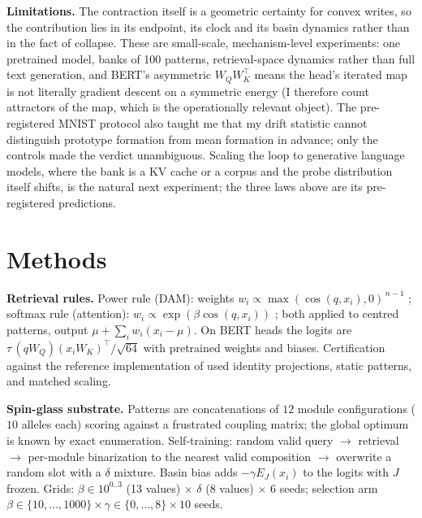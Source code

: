 \documentclass[preprint,12pt,authoryear]{elsarticle}
\begin{document}
\textbf{Limitations.} The contraction itself is a geometric certainty for
convex writes, so the contribution lies in its endpoint, its clock and its
basin dynamics rather than in the fact of collapse. These are small-scale,
mechanism-level experiments:
one pretrained model, banks of 100 patterns, retrieval-space dynamics
rather than full text generation, and BERT's asymmetric $W_Q W_K^{\top}$
means the head's iterated map is not literally gradient descent on a
symmetric energy (I therefore count attractors of the map, which is the
operationally relevant object). The pre-registered MNIST protocol also
taught me that my drift statistic cannot distinguish prototype formation
from mean formation in advance; only the controls made the verdict
unambiguous. Scaling the loop to generative language models, where the
bank is a KV cache or a corpus and the probe distribution itself shifts,
is the natural next experiment; the three laws above are its
pre-registered predictions.

\section{Methods}

\textbf{Retrieval rules.} Power rule (DAM): weights
$w_i\propto\max(\cos(q,x_i),0)^{\,n-1}$ \citep{krotov2016}; softmax rule
(attention): $w_i\propto\exp(\beta\cos(q,x_i))$ \citep{ramsauer2021}; both
applied to centred patterns, output $\mu + \sum_i w_i (x_i-\mu)$. On BERT
heads the logits are $\tau\,(qW_Q)(x_iW_K)^{\top}/\sqrt{64}$ with
pretrained weights and biases. Certification against the reference
implementation of \citet{ramsauer2021} used identity projections, static
patterns, and matched scaling.

\textbf{Spin-glass substrate.} Patterns are concatenations of $12$ module
configurations ($10$ alleles each) scoring against a frustrated coupling
matrix; the global optimum is known by exact enumeration. Self-training:
random valid query $\to$ retrieval $\to$ per-module binarization to the
nearest valid composition $\to$ overwrite a random slot with a $\delta$
mixture. Basin bias adds $-\gamma E_J(x_i)$ to the logits with $J$ frozen.
Grids: $\beta\in10^{0..3}$ (13 values) $\times$ $\delta$ (8 values)
$\times$ 6 seeds; selection arm $\beta\in\{10,\dots,1000\}\times
\gamma\in\{0,\dots,8\}\times10$ seeds.
\end{document}
